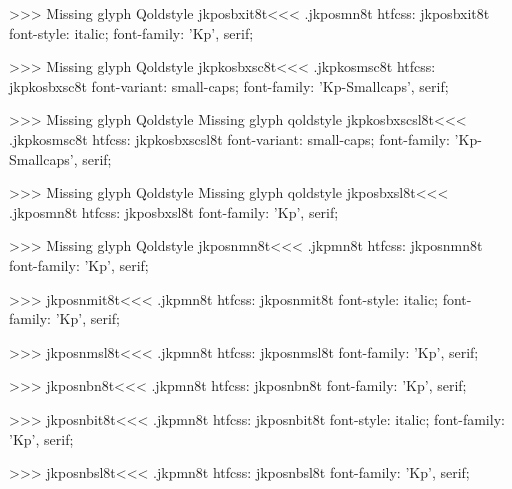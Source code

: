 >>>
Missing glyph	Qoldstyle
\<jkposbxit8t\><<<
.jkposmn8t
htfcss:  jkposbxit8t  font-style: italic; font-family: 'Kp', serif;

>>>
Missing glyph	Qoldstyle
\<jkpkosbxsc8t\><<<
.jkpkosmsc8t
htfcss:  jkpkosbxsc8t  font-variant: small-caps; font-family: 'Kp-Smallcaps', serif;

>>>
Missing glyph	Qoldstyle
Missing glyph	qoldstyle
\<jkpkosbxscsl8t\><<<
.jkpkosmsc8t
htfcss:  jkpkosbxscsl8t  font-variant: small-caps; font-family: 'Kp-Smallcaps', serif;

>>>
Missing glyph	Qoldstyle
Missing glyph	qoldstyle
\<jkposbxsl8t\><<<
.jkposmn8t
htfcss:  jkposbxsl8t  font-family: 'Kp', serif;

>>>
Missing glyph	Qoldstyle
\<jkposnmn8t\><<<
.jkpmn8t
htfcss:  jkposnmn8t  font-family: 'Kp', serif;

>>>
\<jkposnmit8t\><<<
.jkpmn8t
htfcss:  jkposnmit8t  font-style: italic; font-family: 'Kp', serif;

>>>
\<jkposnmsl8t\><<<
.jkpmn8t
htfcss:  jkposnmsl8t  font-family: 'Kp', serif;

>>>
\<jkposnbn8t\><<<
.jkpmn8t
htfcss:  jkposnbn8t  font-family: 'Kp', serif;

>>>
\<jkposnbit8t\><<<
.jkpmn8t
htfcss:  jkposnbit8t  font-style: italic; font-family: 'Kp', serif;

>>>
\<jkposnbsl8t\><<<
.jkpmn8t
htfcss:  jkposnbsl8t  font-family: 'Kp', serif;

